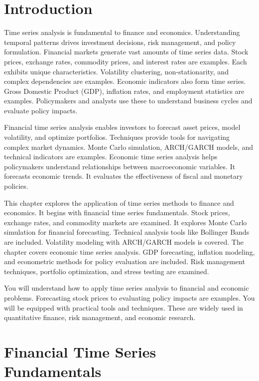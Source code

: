 \section{Introduction}

Time series analysis is fundamental to finance and economics. Understanding temporal patterns drives investment decisions, risk management, and policy formulation. Financial markets generate vast amounts of time series data. Stock prices, exchange rates, commodity prices, and interest rates are examples. Each exhibits unique characteristics. Volatility clustering, non-stationarity, and complex dependencies are examples. Economic indicators also form time series. Gross Domestic Product (GDP), inflation rates, and employment statistics are examples. Policymakers and analysts use these to understand business cycles and evaluate policy impacts.

Financial time series analysis enables investors to forecast asset prices, model volatility, and optimize portfolios. Techniques provide tools for navigating complex market dynamics. Monte Carlo simulation, ARCH/GARCH models, and technical indicators are examples. Economic time series analysis helps policymakers understand relationships between macroeconomic variables. It forecasts economic trends. It evaluates the effectiveness of fiscal and monetary policies.

This chapter explores the application of time series methods to finance and economics. It begins with financial time series fundamentals. Stock prices, exchange rates, and commodity markets are examined. It explores Monte Carlo simulation for financial forecasting. Technical analysis tools like Bollinger Bands are included. Volatility modeling with ARCH/GARCH models is covered. The chapter covers economic time series analysis. GDP forecasting, inflation modeling, and econometric methods for policy evaluation are included. Risk management techniques, portfolio optimization, and stress testing are examined.

You will understand how to apply time series analysis to financial and economic problems. Forecasting stock prices to evaluating policy impacts are examples. You will be equipped with practical tools and techniques. These are widely used in quantitative finance, risk management, and economic research.

\section{Financial Time Series Fundamentals}

